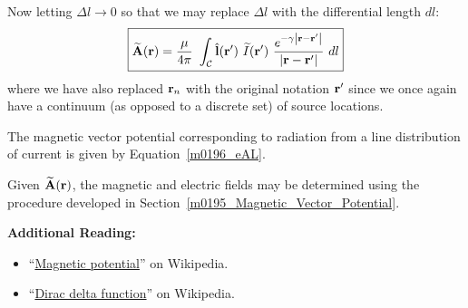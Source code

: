 %
Now letting $\Delta l\rightarrow 0$ so that we may replace $\Delta l$ with the differential length $dl$:
\begin{equation}
\boxed{
\widetilde{\bf A}({\bf r}) = \frac{\mu}{4\pi}~\int_{\mathcal{C}} \hat{\bf l}({\bf r}')~\widetilde{I}({\bf r}')~\frac{e^{-\gamma \left|{\bf r}-{\bf r}'\right|}}{\left|{\bf r}-{\bf r}'\right|} ~dl
}
\label{m0196_eAL}
\end{equation}
%
where we have also replaced ${\bf r}_n$ with the original notation ${\bf r}'$ since we once again have a continuum (as opposed to a discrete set) of source locations.
%
\begin{mdframed}[backgroundcolor=yellow!20,nobreak=true] 
The magnetic vector potential corresponding to radiation from a line distribution of current is given by Equation~\ref{m0196_eAL}. 
\end{mdframed}

Given $\widetilde{\bf A}({\bf r})$, the magnetic and electric fields may be determined using the procedure developed in Section~\ref{m0195_Magnetic_Vector_Potential}.


{\bf Additional Reading:}
\begin{itemize}
\item ``\href{https://en.wikipedia.org/wiki/Magnetic_potential}{Magnetic potential}'' on Wikipedia.
\item ``\href{https://en.wikipedia.org/wiki/Dirac_delta_function}{Dirac delta function}'' on Wikipedia.
\end{itemize}



